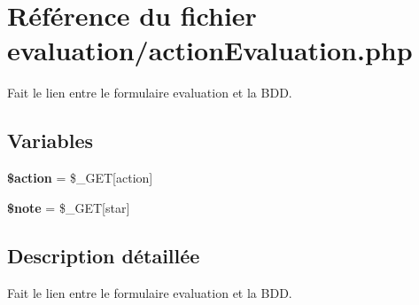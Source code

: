 \hypertarget{actionEvaluation_8php}{}\section{Référence du fichier evaluation/action\+Evaluation.php}
\label{actionEvaluation_8php}


Fait le lien entre le formulaire evaluation et la B\+DD.  


\subsection*{Variables}
\begin{DoxyCompactItemize}
\item 
\mbox{\label{actionEvaluation_8php_aa698a3e72116e8e778be0e95d908ee30}} 
{\bfseries \$action} = \$\+\_\+\+G\+ET\mbox{[}\textquotesingle{}action\textquotesingle{}\mbox{]}
\item 
\mbox{\label{actionEvaluation_8php_a94fd1dcedc1bbef06b8a9fd0086526b3}} 
{\bfseries \$note} = \$\+\_\+\+G\+ET\mbox{[}\textquotesingle{}star\textquotesingle{}\mbox{]}
\end{DoxyCompactItemize}


\subsection{Description détaillée}
Fait le lien entre le formulaire evaluation et la B\+DD. 

